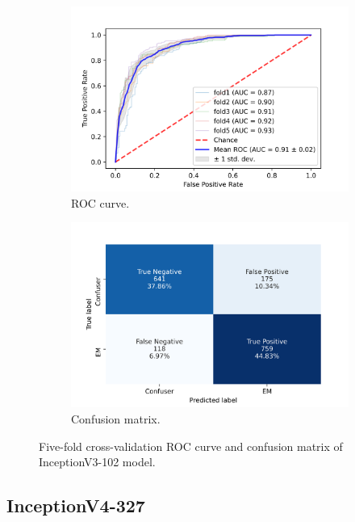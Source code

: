 \begin{figure}[h!]
	\centering
	\begin{subfigure}[b]{0.49\textwidth}
		\centering
		\includegraphics[width=\textwidth,keepaspectratio]{images/Supplement4/image97.png}
		\caption{ROC curve.}
	\end{subfigure}
	\hfill
	\begin{subfigure}[b]{0.49\textwidth}
		\centering
		\includegraphics[width=\textwidth,keepaspectratio]{images/Supplement4/image102.png}
		\caption{Confusion matrix.}
	\end{subfigure}
	\caption{Five-fold cross-validation ROC curve and confusion matrix of InceptionV3-102 model.}
\end{figure}

\vfill\clearpage
\subsection{InceptionV4-327}

